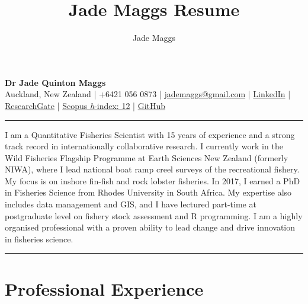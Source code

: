 \documentclass[10pt,a4paper]{article}
\author{Jade Maggs}
\title{Jade Maggs Resume}
\begin{document}
	
\noindent
{\Large \textbf{Dr Jade Quinton Maggs}}\\
{\small Auckland, New Zealand | +6421 056 0873 | \href{mailto:jademaggs@gmail.com}{jademaggs@gmail.com} |
\href{https://www.linkedin.com/in/jade-maggs-phd-5a091729/}{LinkedIn} |
			\href{https://www.researchgate.net/profile/Jade_Maggs}{ResearchGate} | 
			\href{https://www.scopus.com/authid/detail.uri?authorId=55250227800}{Scopus \textit{h}-index: 12} |
			\href{https://github.com/jademaggs?tab=repositories}{GitHub}}\\
\hrule
\vspace{6pt}
\noindent
I am a Quantitative Fisheries Scientist with 15 years of experience and a strong track record in internationally collaborative research. I currently work in the Wild Fisheries Flagship Programme at Earth Sciences New Zealand (formerly NIWA), where I lead national boat ramp creel surveys of the recreational fishery. My focus is on inshore fin-fish and rock lobster fisheries. In 2017, I earned a PhD in Fisheries Science from Rhodes University in South Africa. My expertise also includes data management and GIS, and I have lectured part-time at postgraduate level on fishery stock assessment and R programming. I am a highly organised professional with a proven ability to lead change and drive innovation in fisheries science. \\
\hrule
\vspace{6pt}
\noindent


\section*{Professional Experience}
\end{document}
